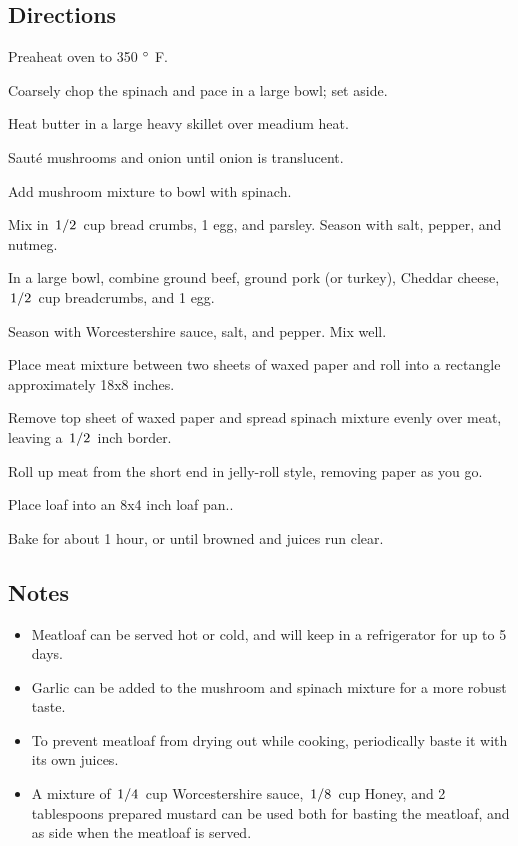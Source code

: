 \documentclass{article}
\newcounter{qcounter}
\begin{document}
\subsection*{Directions}
\begin{list}{:~}{}
\item Preaheat oven to 350 $^\circ$ F.
\item Coarsely chop the spinach and pace in a large bowl; set aside.
\item Heat butter in a large heavy skillet over meadium heat.
\item Sauté mushrooms and onion until onion is translucent.
\item Add mushroom mixture to bowl with spinach.
\item Mix in $\left.1\middle/2\right.$ cup bread crumbs, 1 egg, and parsley.  Season with salt, pepper, and nutmeg.
\item In a large bowl, combine ground beef, ground pork (or turkey), Cheddar cheese, $\left.1\middle/2\right.$ cup breadcrumbs, and 1 egg.
\item Season with Worcestershire sauce, salt, and pepper.  Mix well.
\item Place meat mixture between two sheets of waxed paper and roll into a rectangle approximately 18x8 inches.
\item Remove top sheet of waxed paper and spread spinach mixture evenly over meat, leaving a $\left.1\middle/2\right.$ inch border.
\item Roll up meat from the short end in jelly-roll style, removing paper as you go.
\item Place loaf into an 8x4 inch loaf pan..
\item Bake for about 1 hour, or until browned and juices run clear.
\end{list}

\subsection*{Notes}
\begin{itemize}
\item Meatloaf can be served hot or cold, and will keep in a refrigerator for up to 5 days.
\item Garlic can be added to the mushroom and spinach mixture for a more robust taste.
\item To prevent meatloaf from drying out while cooking, periodically baste it with its own juices.
\item A mixture of $\left.1\middle/4\right.$ cup Worcestershire sauce, $\left.1\middle/8\right.$ cup Honey, and 2 tablespoons prepared mustard can be used both for basting the meatloaf, and as side when the meatloaf is served.
\end{itemize}
\end{document}
